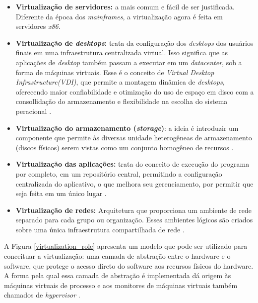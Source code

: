 \begin{itemize}
\item \textbf{Virtualização de servidores:} a mais comum e fácil de ser justificada. Diferente da época dos \textit{mainframes}, a virtualização agora é feita em servidores \textit{x86}.

\item \textbf{Virtualização de \textit{desktops}:} trata da configuração dos \textit{desktops} dos usuários finais em uma infraestrutura centralizada virtual. Isso significa que as aplicações de \textit{desktop} também passam a executar em um \textit{datacenter}, sob a forma de máquinas virtuais. Esse é o conceito de \textit{Virtual Desktop Infrastructure(VDI)}, que permite a montagem dinâmica de \textit{desktops}, oferecendo maior confiabilidade e otimização do uso de espaço em disco com a consollidação do armazenamento e flexibilidade na escolha do sistema peracional \cite{manoel}.

\item \textbf{Virtualização do armazenamento (\textit{storage})}: a ideia é introduzir um componente que permite às diversas unidade heterogêneas de armazenamento (discos físicos) serem vistas como um conjunto homogêneo de recursos \cite{manoel}.

\item \textbf{Virtualização das aplicações:} trata do conceito de execução do programa por completo, em um repositório central, permitindo a configuração centralizada do aplicativo, o que melhora seu gerenciamento, por permitir que seja feita em um único lugar \cite{manoel}. 

\item \textbf{Virtualização de redes: } Arquitetura que proporciona um ambiente de rede separado para cada grupo ou organização. Esses ambientes lógicos são criados sobre uma única infraestrutura compartilhada de rede \cite{manoel}.

\end{itemize}

A Figura \ref{virtualization_role} apresenta um modelo que pode ser utilizado para conceituar a virtualização: uma camada de abstração entre o hardware e o software, que protege o acesso direto do software aos recursos físicos do hardware. A forma pela qual essa camada de abstração é implementada dá origem às máquinas virtuais de processo e aos monitores de máquinas virtuais também chamados de \textit{hypervisor} \cite{manoel}.

